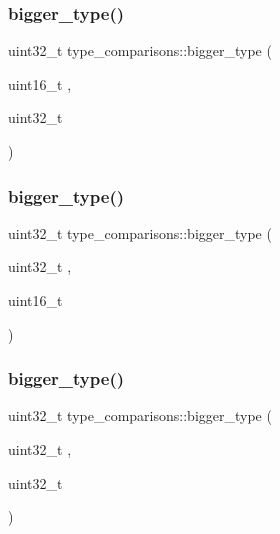 \hypertarget{namespacetype__comparisons_a228f7b0727f18f638ed3a4da3eee2651}{}\label{namespacetype__comparisons_a228f7b0727f18f638ed3a4da3eee2651} 
\subsubsection{\texorpdfstring{bigger\+\_\+type()}{bigger\_type()}\hspace{0.1cm}{\footnotesize\ttfamily [7/12]}}
{\footnotesize\ttfamily uint32\+\_\+t type\+\_\+comparisons\+::bigger\+\_\+type (\begin{DoxyParamCaption}\item[{uint16\+\_\+t}]{,  }\item[{uint32\+\_\+t}]{ }\end{DoxyParamCaption})}

\hypertarget{namespacetype__comparisons_ac4490018d4c7e3eeba1e400367b2b96a}{}\label{namespacetype__comparisons_ac4490018d4c7e3eeba1e400367b2b96a} 
\subsubsection{\texorpdfstring{bigger\+\_\+type()}{bigger\_type()}\hspace{0.1cm}{\footnotesize\ttfamily [8/12]}}
{\footnotesize\ttfamily uint32\+\_\+t type\+\_\+comparisons\+::bigger\+\_\+type (\begin{DoxyParamCaption}\item[{uint32\+\_\+t}]{,  }\item[{uint16\+\_\+t}]{ }\end{DoxyParamCaption})}

\hypertarget{namespacetype__comparisons_a6691cf9e4c6d55e3a37c12ace5f1e124}{}\label{namespacetype__comparisons_a6691cf9e4c6d55e3a37c12ace5f1e124} 
\subsubsection{\texorpdfstring{bigger\+\_\+type()}{bigger\_type()}\hspace{0.1cm}{\footnotesize\ttfamily [9/12]}}
{\footnotesize\ttfamily uint32\+\_\+t type\+\_\+comparisons\+::bigger\+\_\+type (\begin{DoxyParamCaption}\item[{uint32\+\_\+t}]{,  }\item[{uint32\+\_\+t}]{ }\end{DoxyParamCaption})}

